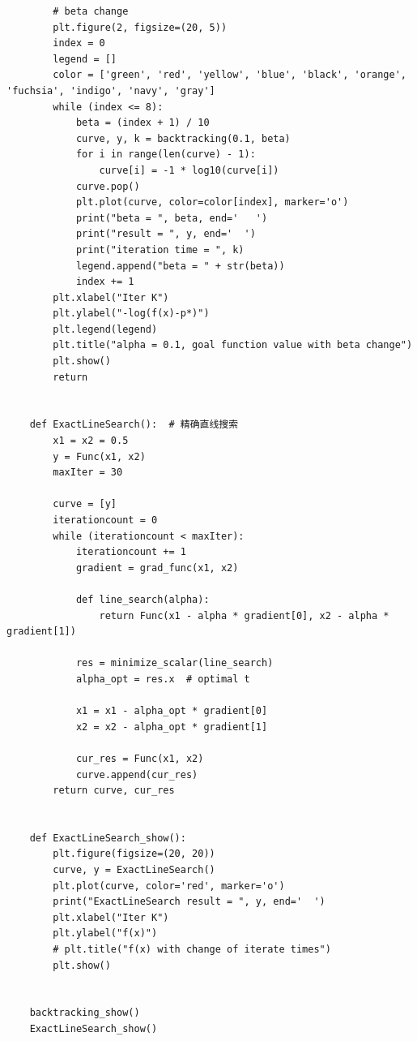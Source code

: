 \documentclass{article}
\begin{document}
\begin{lstlisting}
        # beta change
        plt.figure(2, figsize=(20, 5))
        index = 0
        legend = []
        color = ['green', 'red', 'yellow', 'blue', 'black', 'orange', 'fuchsia', 'indigo', 'navy', 'gray']
        while (index <= 8):
            beta = (index + 1) / 10
            curve, y, k = backtracking(0.1, beta)
            for i in range(len(curve) - 1):
                curve[i] = -1 * log10(curve[i])
            curve.pop()
            plt.plot(curve, color=color[index], marker='o')
            print("beta = ", beta, end='   ')
            print("result = ", y, end='  ')
            print("iteration time = ", k)
            legend.append("beta = " + str(beta))
            index += 1
        plt.xlabel("Iter K")
        plt.ylabel("-log(f(x)-p*)")
        plt.legend(legend)
        plt.title("alpha = 0.1, goal function value with beta change")
        plt.show()
        return
    
    
    def ExactLineSearch():  # 精确直线搜索
        x1 = x2 = 0.5
        y = Func(x1, x2)
        maxIter = 30
    
        curve = [y]
        iterationcount = 0
        while (iterationcount < maxIter):
            iterationcount += 1
            gradient = grad_func(x1, x2)
    
            def line_search(alpha):
                return Func(x1 - alpha * gradient[0], x2 - alpha * gradient[1])
    
            res = minimize_scalar(line_search)
            alpha_opt = res.x  # optimal t
    
            x1 = x1 - alpha_opt * gradient[0]
            x2 = x2 - alpha_opt * gradient[1]
    
            cur_res = Func(x1, x2)
            curve.append(cur_res)
        return curve, cur_res
    
    
    def ExactLineSearch_show():
        plt.figure(figsize=(20, 20))
        curve, y = ExactLineSearch()
        plt.plot(curve, color='red', marker='o')
        print("ExactLineSearch result = ", y, end='  ')
        plt.xlabel("Iter K")
        plt.ylabel("f(x)")
        # plt.title("f(x) with change of iterate times")
        plt.show()
    
    
    backtracking_show()
    ExactLineSearch_show()
    
    \end{lstlisting}
\end{document}
